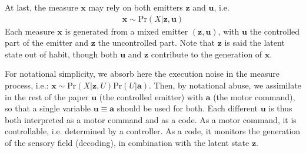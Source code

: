 \documentclass[12pt,twoside,openright]{article}
\begin{document}
At last, the measure $\boldsymbol{x}$ may rely on both emitters $\boldsymbol{z}$ and $\boldsymbol{u}$, i.e. 
\begin{align}
\boldsymbol{x} \sim \text{Pr}(X|\boldsymbol{z}, \boldsymbol{u})
\label{eq:gen}
\end{align} 
Each measure $\boldsymbol{x}$ is generated from a mixed emitter $(\boldsymbol{z}, \boldsymbol{u})$, with $\boldsymbol{u}$ the controlled part of the emitter and  $\boldsymbol{z}$ the uncontrolled part. Note that $\boldsymbol{z}$ is said the latent state out of habit, though both $\boldsymbol{u}$ and $\boldsymbol{z}$ contribute to the generation of $\boldsymbol{x}$.

For notational simplicity, we absorb here the execution noise \cite{van2004role} in the measure process, i.e.:
$\boldsymbol{x} \sim \text{Pr}(X|\boldsymbol{z}, U)\text{Pr}(U|\boldsymbol{a})$.
Then, by notational abuse, we assimilate in the rest of the paper  $\boldsymbol{u}$ (the controlled emitter) with $\boldsymbol{a}$ (the motor command), so that 
a single variable $\boldsymbol{u} \equiv \boldsymbol{a}$ should be used for both. %
Each different $\boldsymbol{u}$ is thus both interpreted as a
motor command and as a code. As a motor command, it is controllable, i.e. determined by a controller. As a code, it monitors the generation of the sensory field (decoding), in combination with the latent state $\boldsymbol{z}$. 





\end{document}
